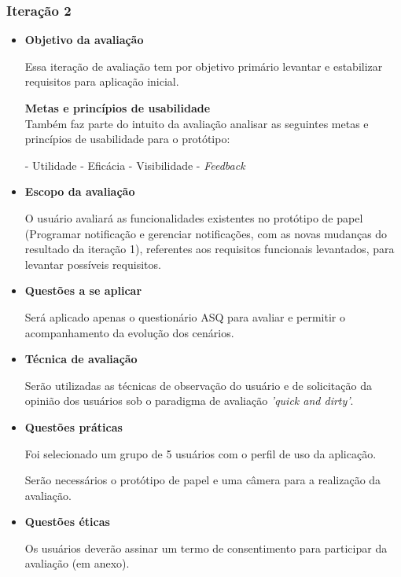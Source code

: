 	\subsubsection{Iteração 2}
	  
	  \begin{itemize}
	  
	   \item \textbf{Objetivo da avaliação}
	      
	      \subitem Essa iteração de avaliação tem por objetivo primário levantar e estabilizar
		requisitos para aplicação inicial.
	      
	      \subitem \textbf{Metas e princípios de usabilidade}\\
		Também faz parte do intuito da avaliação analisar as seguintes metas e princípios de usabilidade para o protótipo:
		
		\subsubitem - Utilidade
		\subsubitem - Eficácia
		\subsubitem - Visibilidade
		\subsubitem - \textit{Feedback}
	    
	   \item \textbf{Escopo da avaliação}
	      
	      \subitem 
		O usuário avaliará as funcionalidades existentes no protótipo de papel 
		(Programar notificação e gerenciar notificações, com as novas mudanças do resultado da iteração 1),
		referentes aos requisitos funcionais levantados, para levantar possíveis requisitos.
	      
	   \item \textbf{Questões a se aplicar}
	      
	      \subitem Será aplicado apenas o questionário ASQ para avaliar e permitir o acompanhamento da evolução dos cenários.
	      
	   \item \textbf{Técnica de avaliação}
	      
	      \subitem 
		Serão utilizadas as técnicas de observação do usuário e de solicitação da opinião dos usuários
		sob o paradigma de avaliação \textit{'quick and dirty'}.
	      
	   \item \textbf{Questões práticas}
	      
	      \subitem Foi selecionado um grupo de 5 usuários com o perfil de uso da aplicação.
	      
	      \subitem Serão necessários o protótipo de papel e uma câmera para a realização da avaliação.
	      
	   \item \textbf{Questões éticas}
	      
	      \subitem 
		Os usuários deverão assinar um termo de consentimento para participar da avaliação (em anexo).
	   
	  \end{itemize}
      
